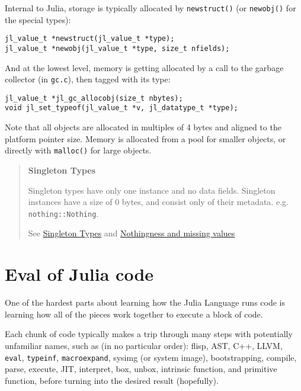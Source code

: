 Internal to Julia, storage is typically allocated by \texttt{newstruct()} (or \texttt{newobj()} for the special types):




\begin{lstlisting}
jl_value_t *newstruct(jl_value_t *type);
jl_value_t *newobj(jl_value_t *type, size_t nfields);
\end{lstlisting}



And at the lowest level, memory is getting allocated by a call to the garbage collector (in \texttt{gc.c}), then tagged with its type:




\begin{lstlisting}
jl_value_t *jl_gc_allocobj(size_t nbytes);
void jl_set_typeof(jl_value_t *v, jl_datatype_t *type);
\end{lstlisting}



Note that all objects are allocated in multiples of 4 bytes and aligned to the platform pointer size. Memory is allocated from a pool for smaller objects, or directly with \texttt{malloc()} for large objects.



\begin{quote}
\textbf{Singleton Types}

Singleton types have only one instance and no data fields. Singleton instances have a size of 0 bytes, and consist only of their metadata. e.g. \texttt{nothing::Nothing}.

See \hyperlink{14008188290941962431}{Singleton Types} and \hyperlink{16167110558547130797}{Nothingness and missing values}

\end{quote}


\hypertarget{12968133543622581514}{}


\section{Eval of Julia code}



One of the hardest parts about learning how the Julia Language runs code is learning how all of the pieces work together to execute a block of code.



Each chunk of code typically makes a trip through many steps with potentially unfamiliar names, such as (in no particular order): flisp, AST, C++, LLVM, \texttt{eval}, \texttt{typeinf}, \texttt{macroexpand}, sysimg (or system image), bootstrapping, compile, parse, execute, JIT, interpret, box, unbox, intrinsic function, and primitive function, before turning into the desired result (hopefully).



